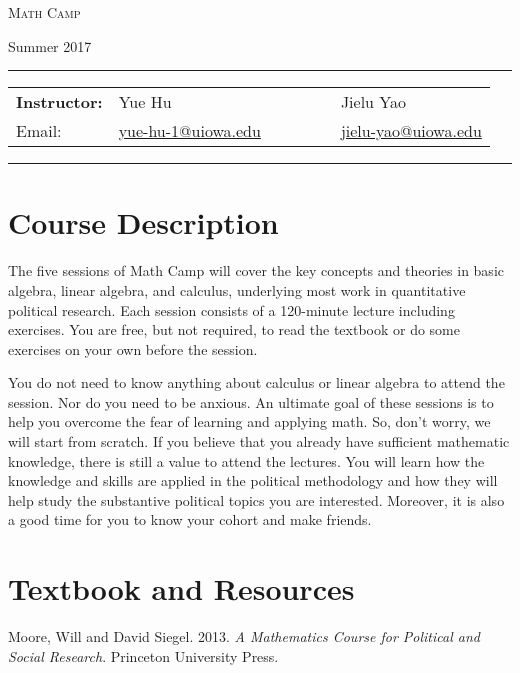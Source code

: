 \documentclass[11pt, a4paper]{article}
\begin{document}
\begin{center}
{\Large \textsc{Math Camp}}
\end{center}
\begin{center}
Summer 2017
\end{center}

\begin{center}
\rule{6in}{0.4pt}
\begin{minipage}[t]{.75\textwidth}
\begin{tabular}{llcccll}
\textbf{Instructor:} & Yue Hu & & &  &  & Jielu Yao  \\
Email: &  \href{mailto:yue-hu-1@uiowa.edu}{yue-hu-1@uiowa.edu} & & & &  & \href{mailto:jielu-yao@uiowa.edu}{jielu-yao@uiowa.edu} 
\end{tabular}
\end{minipage}
\rule{6in}{0.4pt}
\end{center}
\vspace{.5cm}
\setlength{\unitlength}{1in}
\renewcommand{\arraystretch}{2}

\section{Course Description}
The five sessions of Math Camp will cover the key concepts and theories in basic algebra, linear algebra, and calculus, underlying most work in quantitative political research. 
Each session consists of a 120-minute lecture including exercises. 
You are free, but not required, to read the textbook or do some exercises on your own before the session.

You do not need to know anything about calculus or linear algebra to attend the session. 
Nor do you need to be anxious. 
An ultimate goal of these sessions is to help you overcome the fear of learning and applying math. 
So, don't worry, we will start from scratch.
If you believe that you already have sufficient mathematic knowledge, there is still a value to attend the lectures. 
You will learn how the knowledge and skills are applied in the political methodology and how they will help study the substantive political topics you are interested.
Moreover, it is also a good time for you to know your cohort and make friends.

\section{Textbook and Resources}
Moore, Will and David Siegel. 2013. {\it A Mathematics Course for Political and Social Research}. Princeton University Press.
\end{document}
